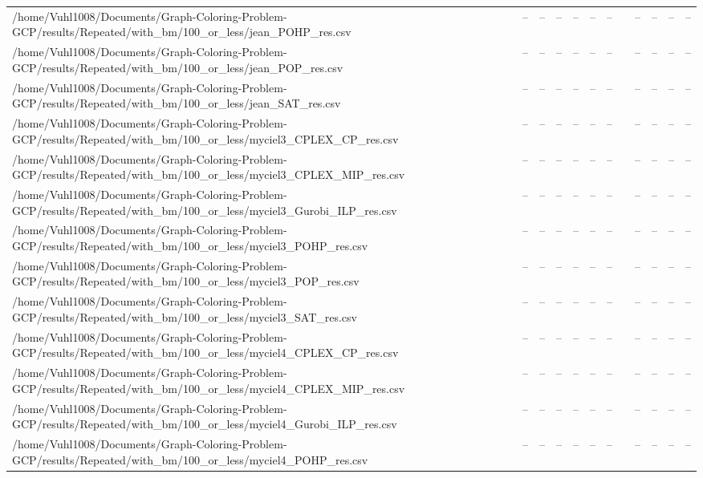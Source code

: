 \begin{table}[htbp]
\begin{tabular}{llllllllllll}
/home/Vuhl1008/Documents/Graph-Coloring-Problem-GCP/results/Repeated/with\_bm/100\_or\_less/jean\_POHP\_res.csv & -- & -- & -- & -- & -- & -- & {} & -- & -- & -- & -- \\
/home/Vuhl1008/Documents/Graph-Coloring-Problem-GCP/results/Repeated/with\_bm/100\_or\_less/jean\_POP\_res.csv & -- & -- & -- & -- & -- & -- & {} & -- & -- & -- & -- \\
/home/Vuhl1008/Documents/Graph-Coloring-Problem-GCP/results/Repeated/with\_bm/100\_or\_less/jean\_SAT\_res.csv & -- & -- & -- & -- & -- & -- & {} & -- & -- & -- & -- \\
/home/Vuhl1008/Documents/Graph-Coloring-Problem-GCP/results/Repeated/with\_bm/100\_or\_less/myciel3\_CPLEX\_CP\_res.csv & -- & -- & -- & -- & -- & -- & {} & -- & -- & -- & -- \\
/home/Vuhl1008/Documents/Graph-Coloring-Problem-GCP/results/Repeated/with\_bm/100\_or\_less/myciel3\_CPLEX\_MIP\_res.csv & -- & -- & -- & -- & -- & -- & {} & -- & -- & -- & -- \\
/home/Vuhl1008/Documents/Graph-Coloring-Problem-GCP/results/Repeated/with\_bm/100\_or\_less/myciel3\_Gurobi\_ILP\_res.csv & -- & -- & -- & -- & -- & -- & {} & -- & -- & -- & -- \\
/home/Vuhl1008/Documents/Graph-Coloring-Problem-GCP/results/Repeated/with\_bm/100\_or\_less/myciel3\_POHP\_res.csv & -- & -- & -- & -- & -- & -- & {} & -- & -- & -- & -- \\
/home/Vuhl1008/Documents/Graph-Coloring-Problem-GCP/results/Repeated/with\_bm/100\_or\_less/myciel3\_POP\_res.csv & -- & -- & -- & -- & -- & -- & {} & -- & -- & -- & -- \\
/home/Vuhl1008/Documents/Graph-Coloring-Problem-GCP/results/Repeated/with\_bm/100\_or\_less/myciel3\_SAT\_res.csv & -- & -- & -- & -- & -- & -- & {} & -- & -- & -- & -- \\
/home/Vuhl1008/Documents/Graph-Coloring-Problem-GCP/results/Repeated/with\_bm/100\_or\_less/myciel4\_CPLEX\_CP\_res.csv & -- & -- & -- & -- & -- & -- & {} & -- & -- & -- & -- \\
/home/Vuhl1008/Documents/Graph-Coloring-Problem-GCP/results/Repeated/with\_bm/100\_or\_less/myciel4\_CPLEX\_MIP\_res.csv & -- & -- & -- & -- & -- & -- & {} & -- & -- & -- & -- \\
/home/Vuhl1008/Documents/Graph-Coloring-Problem-GCP/results/Repeated/with\_bm/100\_or\_less/myciel4\_Gurobi\_ILP\_res.csv & -- & -- & -- & -- & -- & -- & {} & -- & -- & -- & -- \\
/home/Vuhl1008/Documents/Graph-Coloring-Problem-GCP/results/Repeated/with\_bm/100\_or\_less/myciel4\_POHP\_res.csv & -- & -- & -- & -- & -- & -- & {} & -- & -- & -- & -- \\

\end{tabular}
\end{table}
